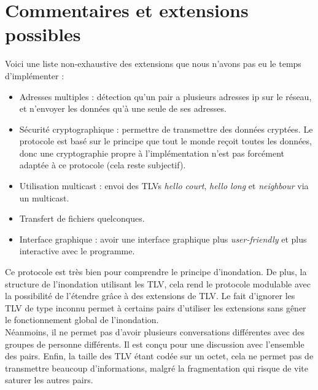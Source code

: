 \documentclass{FR16}
\begin{document}

\section{Commentaires et extensions possibles}
Voici une liste non-exhaustive des extensions que nous n'avons pas eu le temps d'implémenter :
\begin{itemize}
    \item Adresses multiples : détection qu'un pair a plusieurs adresses ip sur le réseau, et n'envoyer les données qu'à une seule de ses adresses.
    \item Sécurité cryptographique : permettre de transmettre des données cryptées. Le protocole est basé sur le principe que tout le monde reçoit toutes les données, donc une cryptographie propre à l'implémentation n'est pas forcément adaptée à ce protocole (cela reste subjectif).
    \item Utilisation multicast : envoi des TLVs \textit{hello court}, \textit{hello long} et \textit{neighbour} via un multicast.
    \item Transfert de fichiers quelconques.
    \item Interface graphique : avoir une interface graphique plus \textit{user-friendly} et plus interactive avec le programme.
\end{itemize}

Ce protocole est très bien pour comprendre le principe d'inondation. De plus, la structure de l'inondation utilisant les TLV, cela rend le protocole modulable avec la possibilité de l'étendre grâce à des extensions de TLV. Le fait d'ignorer les TLV de type inconnu permet à certains pairs d'utiliser les extensions sans gêner le fonctionnement global de l'inondation.\\
Néanmoins, il ne permet pas d'avoir plusieurs conversations différentes avec des groupes de personne différents. Il est conçu pour une discussion avec l'ensemble des pairs. Enfin, la taille des TLV étant codée sur un octet, cela ne permet pas de transmettre beaucoup d'informations, malgré la fragmentation qui risque de vite saturer les autres pairs.

\newpage





\end{document}
